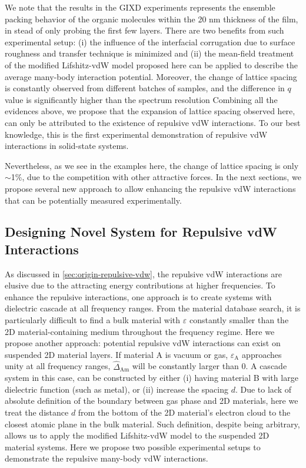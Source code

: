 We note that the results in the GIXD experiments represents the
ensemble packing behavior of the organic molecules within the 20 nm
thickness of the film, in stead of only probing the first few layers.
%
There are two benefits from such experimental setup: (i) the influence
of the interfacial corrugation due to surface roughness and transfer
technique is minimized and (ii) the mean-field treatment of the
modified Lifshitz-vdW model proposed here can be applied to describe
the average many-body interaction potential.
%
Moreover, the change of lattice spacing is constantly observed from
different batches of samples, and the difference in $q$ value is
significantly higher than the spectrum resolution 
%
 Combining all the evidences
%
above, we propose that the expansion of lattice spacing observed here,
can only be attributed to the existence of repulsive vdW interactions.
%
To our best knowledge, this is the first experimental demonstration of
repulsive vdW interactions in solid-state systems.

Nevertheless, as we see in the examples here, the change of lattice spacing is only $\sim{}$1\%, due to the competition with other attractive forces.
%
In the next sections, we propose several new approach to allow enhancing the repulsive vdW interactions that can be potentially measured experimentally.

\subsection{Designing Novel System for Repulsive vdW Interactions}
\label{sec:proposing-new-system}

As discussed in \autoref{sec:origin-repulsive-vdw}, the repulsive vdW
interactions are elusive due to the attracting energy contributions
at higher frequencies.
%
To enhance the repulsive interactions, one approach is to create systems with dielectric cascade at all frequency ranges.
%
From the material database search, it is particularly difficult to
find a bulk material with $\varepsilon$ constantly smaller than the 2D
material-containing medium throughout the frequency
regime. 
Here we propose another approach: potential repulsive vdW interactions
can exist on suspended 2D material layers. If material A is vacuum or
gas, $\varepsilon_{\mathrm{A}}$ approaches unity at all frequency
ranges, $\hat{\Delta}_{\mathrm{Am}}$ will be constantly larger than
0. A cascade system in this case, can be constructed by either (i)
having material B with large dielectric function (such as metal), or
(ii) increase the spacing $d$.
%
 Due to lack of absolute definition of the
boundary between gas phase and 2D materials, here we treat the
distance $d$ from the bottom of the 2D material's electron cloud to
the closest atomic plane in the bulk material.
%
Such definition, despite being arbitrary, 
allows us to apply the modified Lifshitz-vdW model to the suspended 2D
material systems.
%
Here we propose two possible experimental setups to demonstrate the
repulsive many-body vdW interactions.

